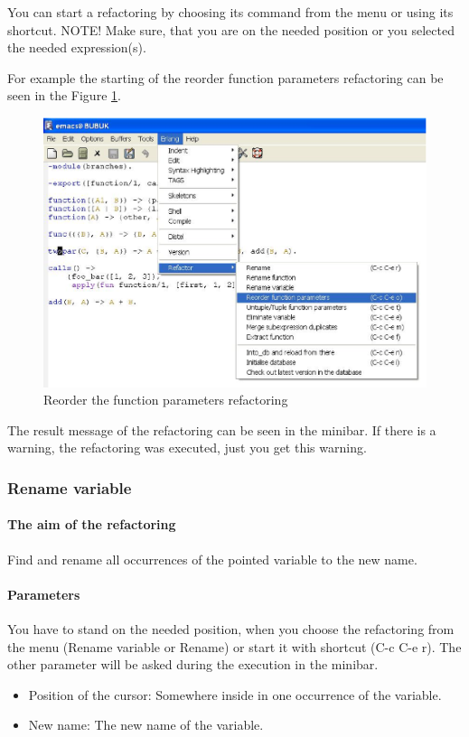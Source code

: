 \documentclass[12pt]{article}
\begin{document}
You can start a refactoring by choosing its command from the menu or using its shortcut.
NOTE! Make sure, that you are on the needed position or you selected the needed expression(s).

For example the starting of the reorder function parameters refactoring can be seen in the Figure \ref{reorder}.

\begin{center}
\begin{figure}[htbp]

    \includegraphics[scale=0.60]{reorder.eps}
   \caption{Reorder the function parameters refactoring}
  \label{reorder}
\end{figure}
\end{center}
The result message of the refactoring can be seen in the minibar. If there is a warning, the refactoring was executed, just you get this warning.


\subsubsection{Rename variable}
\paragraph{The aim of the refactoring}
Find and rename all occurrences of the pointed variable to the new name.
\paragraph{Parameters}
You have to stand on the needed position, when you choose the refactoring from 
the menu (Rename variable or Rename) or start it with shortcut (C-c C-e r).
The other parameter will be asked during the execution in the minibar.
\begin{itemize}
	\item Position of the cursor: Somewhere inside in one occurrence of the variable.
	\item New name: The new name of the variable. 
\end{itemize}
\end{document}
